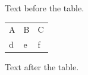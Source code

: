 \documentclass[12pt]{article}
\begin{document}
Text before the table.

\begin{tabular}{lll}A & \cellcolor{yellow}B & C\\\cellcolor[rgb]{0.8,0.9,1}d & e & \cellcolor{red!25}f\\\end{tabular}

Text after the table.
\end{document}
